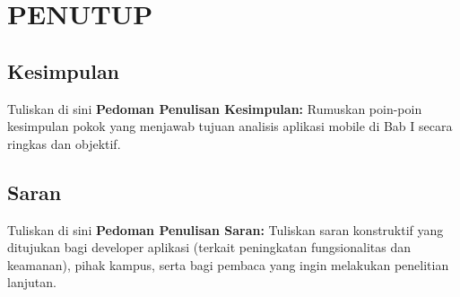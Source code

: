 \chapter{PENUTUP}
\section{Kesimpulan}


Tuliskan di sini \textbf{Pedoman Penulisan Kesimpulan:} Rumuskan poin-poin kesimpulan pokok yang menjawab tujuan analisis aplikasi mobile di Bab I secara ringkas dan objektif.


\section{Saran}


Tuliskan di sini \textbf{Pedoman Penulisan Saran:} Tuliskan saran konstruktif yang ditujukan bagi developer aplikasi (terkait peningkatan fungsionalitas dan keamanan), pihak kampus, serta bagi pembaca yang ingin melakukan penelitian lanjutan.

